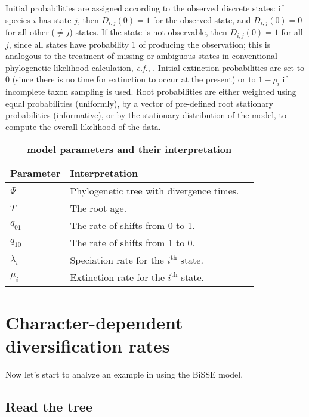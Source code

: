 Initial probabilities are assigned according to the observed discrete states: if species $i$ has state $j$, then $D_{i,j}(0) = 1$ for the observed state, and $D_{i,j}(0) = 0$ for all other ($\neq j$) states.
If the state is not observable, then $D_{i,j}(0) = 1$ for all $j$, since all states have probability 1 of producing the observation; this is analogous to the treatment of missing or ambiguous states in conventional phylogenetic likelihood calculation, \emph{c.f.}, \cite{Felsenstein2004}.
Initial extinction probabilities are set to 0 (since there is no time for extinction to occur at the present) or to $1-\rho_i$ if incomplete taxon sampling is used. 
Root probabilities are either weighted using equal probabilities (uniformly), by a vector of pre-defined root stationary probabilities (informative), or by the stationary distribution of the model, to compute the overall likelihood of the data.


\begin{table}[t!]
	\centering
	\caption{\bf{\BiSSE model parameters and their interpretation}} \label{tab:param}
	\begin{tabular}{ l l l }
		\toprule
		Parameter & Interpretation \\
		\midrule
		$\Psi$ & Phylogenetic tree with divergence times.\\
		\rowcolor{gray!15} $T$ & The root age.\\
		$q_{01}$ & The rate of shifts from 0 to 1.\\
		\rowcolor{gray!15} $q_{10}$ & The rate of shifts from 1 to 0.\\
		$\lambda_i$ & Speciation rate for the $i^\text{th}$ state.\\
		\rowcolor{gray!15} $\mu_i$ & Extinction rate for the $i^\text{th}$ state.\\
	\end{tabular}
\end{table}


\section{Character-dependent diversification rates}\label{sec:CDBDP}
Now let's start to analyze an example in \RevBayes using the BiSSE model.

\subsection{Read the tree}

